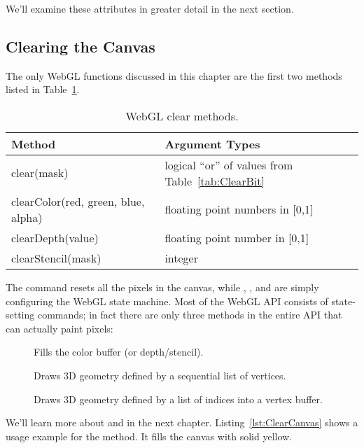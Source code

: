 We'll examine these attributes in greater detail in the next section.


\subsection{Clearing the Canvas}

The only WebGL functions discussed in this chapter are the first two methods listed in Table~\ref{tab:Clearing}.

\begin{table}[htb]\centering
  \begin{tabular}{ll}
    \hline
    Method & Argument Types \\
    \hline
    clear(mask) & logical ``or'' of values from Table~\ref{tab:ClearBit} \\
    clearColor(red, green, blue, alpha)  & floating point numbers in [0,1] \\
    clearDepth(value) & floating point number in [0,1] \\
    clearStencil(mask) & integer \\
    \hline
  \end{tabular}
  \caption{WebGL clear methods.}
  \label{tab:Clearing}
\end{table}

The  command resets all the pixels in the canvas, while , , and  are simply configuring the WebGL state machine.  Most of the WebGL API consists of state-setting commands; in fact there are only three methods in the entire API that can actually paint pixels:

\begin{description}
\item[] Fills the color buffer (or depth/stencil).
\item[] Draws 3D geometry defined by a sequential list of vertices.
\item[] Draws 3D geometry defined by a list of indices into a vertex buffer.
\end{description}

We'll learn more about  and  in the next chapter.  Listing~\ref{lst:ClearCanvas} shows a usage example for the  method.  It fills the canvas with solid yellow.

